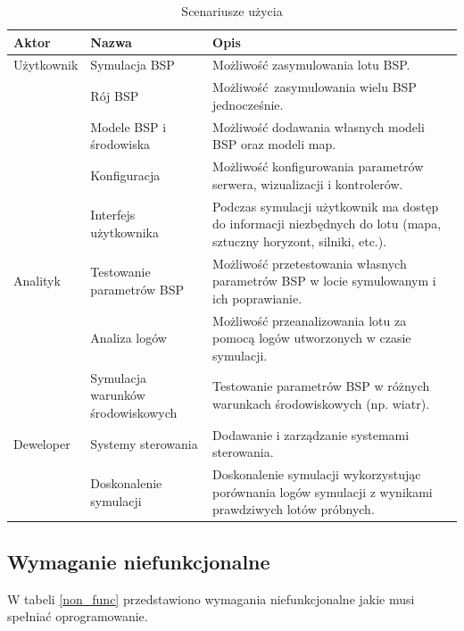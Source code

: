 \documentclass[15pt]{sprawozdanie}
\begin{document}
\renewcommand{\arraystretch}{1.5}
\begin{table}
	\centering
	\begin{tabular}{|m{}|m{}|m{}|} 
		\hline
		\rowcolor{Gray}
		Aktor & Nazwa & Opis \\
		\hline
		\multirow{1}{*}{Użytkownik} 
		& Symulacja BSP & Możliwość zasymulowania lotu BSP.  \\
		\cline{2-3}
		& Rój BSP & Możliwość zasymulowania wielu BSP jednocześnie. \\
		\cline{2-3}
		& Modele BSP i środowiska & Możliwość dodawania własnych modeli BSP oraz modeli map.\\
		\cline{2-3}
		& Konfiguracja & Możliwość konfigurowania parametrów serwera, wizualizacji i kontrolerów.\\
		\cline{2-3}
		& Interfejs użytkownika & Podczas symulacji użytkownik ma dostęp do informacji niezbędnych do lotu (mapa, sztuczny horyzont, silniki, etc.). \\
		\hline
		\multirow{1}{*}{Analityk} 
		& Testowanie parametrów BSP & Możliwość przetestowania własnych parametrów BSP w locie symulowanym i ich poprawianie. \\
		\cline{2-3}
		 & Analiza logów & Możliwość przeanalizowania lotu za pomocą logów utworzonych w czasie symulacji. \\ 
		 \cline{2-3}
		 & Symulacja warunków środowiskowych & Testowanie parametrów BSP w różnych warunkach środowiskowych (np. wiatr).\\ 
		\hline
		\multirow{1}{*}{Deweloper} & Systemy sterowania & Dodawanie i zarządzanie systemami sterowania. \\
		\cline{2-3}
		& Doskonalenie symulacji & Doskonalenie symulacji wykorzystując porównania logów symulacji z wynikami prawdziwych lotów próbnych.\\ 
		\hline
	\end{tabular}
	\caption{Scenariusze użycia}
	\label{use_case}
\end{table}

\subsection{Wymaganie niefunkcjonalne}

W tabeli \ref{non_func} przedstawiono wymagania niefunkcjonalne jakie musi spełniać oprogramowanie.
\end{document}
